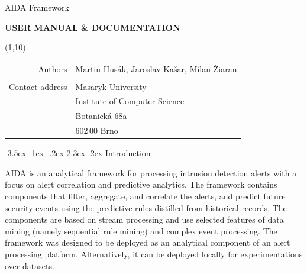 \documentclass[a4paper]{article} %
\makeatletter
\def\muni{Masaryk University}
\def\uvt{Institute of Computer Science}
\def\street{Botanick\'{a} 68a}
\def\psc{602\,00 Brno}
\def\projectname{AIDA Framework}
\def\reportauthor{Martin Hus\'{a}k, Jaroslav Ka\v{s}ar, Milan \v{Z}iaran}
\def\reporttitle{User Manual \& Documentation}
\renewcommand\section{\@startsection {section}{1}{\z@}%
                   {-3.5ex \@plus -1ex \@minus -.2ex}%
                   {2.3ex \@plus.2ex}%
                   {\normalfont\sffamily\Large\bfseries\color{projectcolor}}}
\newcommand\BackImage[2][scale=1]{%
\BgThispage
\backgroundsetup{
  contents={\texttt{[image: \#2]}}
  }
}
\makeatother
\begin{document}
\setlength{\parindent}{0cm}

{
\BackImage[width=1.4\textwidth]{fig/titlepage_bg}

\vspace*{5cm}

\color{white}
  \begin{center}
  \vspace{2cm} {\Huge \projectname}

  \vspace{1cm} {\huge\bfseries\MakeUppercase{\reporttitle}}
  \end{center}

  \begin{textblock}{3}(1,10)
         \begin{tabular}{rl }
            Authors & \reportauthor \\
             & \\
            Contact address & \muni \\
             & \uvt \\
             & \street \\
             & \psc \\
          \end{tabular}
  \end{textblock}
  \cleardoublepage
}

\normalfont



\setcounter{tocdepth}{2}

\tableofcontents

\cleardoublepage

\section{Introduction}

AIDA is an analytical framework for processing intrusion detection alerts with a focus on alert correlation and predictive analytics. The framework contains components that filter, aggregate, and correlate the alerts, and predict future security events using the predictive rules distilled from historical records. The components are based on stream processing and use selected features of data mining (namely sequential rule mining) and complex event processing. The framework was designed to be deployed as an analytical component of an alert processing platform. Alternatively, it can be deployed locally for experimentations over datasets.
\end{document}
